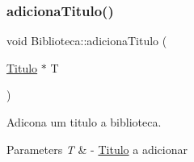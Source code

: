 \subsubsection{\texorpdfstring{adiciona\+Titulo()}{adicionaTitulo()}}
{\footnotesize\ttfamily void Biblioteca\+::adiciona\+Titulo (\begin{DoxyParamCaption}\item[{\hyperlink{classTitulo}{Titulo} $\ast$}]{T }\end{DoxyParamCaption})}



Adicona um titulo a biblioteca. 


\begin{DoxyParams}{Parameters}
{\em T} & -\/ \hyperlink{classTitulo}{Titulo} a adicionar \\
\hline
\end{DoxyParams}

